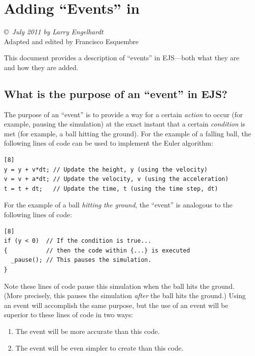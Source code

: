 
\chapter{Adding ``Events'' in \Ejs}\label{chapter:JavascriptEJS}
\begin{center} 
\copyright~\emph{July 2011 by Larry Engelhardt} \\{\small Adapted and edited by Francisco Esquembre}
\end{center}

This document provides a description of ``events'' in EJS---both what they are and how they are added.

\section{What is the purpose of an ``event'' in EJS?}

The purpose of an ``event'' is to provide a way for a certain \emph{action} to occur (for example, pausing the simulation) at the exact instant that a certain \emph{condition} is met (for example, a ball hitting the ground).  For the example of a falling ball, the following lines of code can be used to implement the Euler algorithm: 
\begin{verbatim}[8]
y = y + v*dt; // Update the height, y (using the velocity)
v = v + a*dt; // Update the velocity, v (using the acceleration)
t = t + dt;   // Update the time, t (using the time step, dt)
\end{verbatim}

For the example of a ball \emph{hitting the ground}, the ``event'' is analogous to the following lines of code:
\begin{verbatim}[8]
if (y < 0)  // If the condition is true...
{           // then the code within {...} is executed
  _pause(); // This pauses the simulation.
}
\end{verbatim}

Note these lines of code pause this simulation when the ball hits the ground. (More precisely, this pauses the simulation \emph{after} the ball hits the ground.)  Using an event will accomplish the same purpose, but the use of an event will be superior to these lines of code in two ways:
\begin{enumerate}
\item The event will be more accurate than this code.
\item The event will be even simpler to create than this code.
\end{enumerate}

